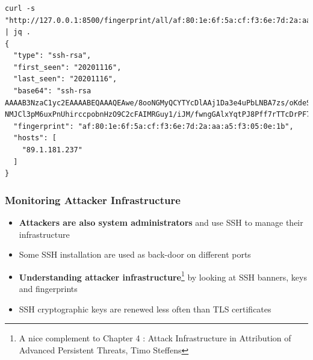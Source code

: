 \documentclass{beamer}
\begin{document}
\begin{frame}[t,fragile]
        \frametitle{}
\lstset{breaklines=true, language=JavaScript}
\begin{lstlisting}
curl -s "http://127.0.0.1:8500/fingerprint/all/af:80:1e:6f:5a:cf:f3:6e:7d:2a:aa:a5:f3:05:0e:1b"  | jq .
{
  "type": "ssh-rsa",
  "first_seen": "20201116",
  "last_seen": "20201116",
  "base64": "ssh-rsa AAAAB3NzaC1yc2EAAAABEQAAAQEAwe/8ooNGMyQCYTYcDlAAj1Da3e4uPbLNBA7zs/oKdeS9JhuJBO5oN0rwKk9B7Y429AL3OHHZUPVQMJ2Rt+fEfObYtLt+BI+289/DYdddUNxX3gU80rF4qiz1uQJ1FjcyW+LN1y219DE9rSshjY6aNPUshDhRuGnBxS
NMJCl3pM6uxPnUhirccpobnHzO9C2cFAIMRGuy1/iJM/fwngGAlxYqtPJ8Pff7rTTcDrPF7YB7STSQXvBTgiwCHVEuxyQaX7Aik5BM0A0DHDrwf6VHDbqWXK6AAM+01W8j1b+lN+yzT4+EZbQJ4kQKfNb8aGWAcHacjs9VOfr4w79ynz/lPQ==",
  "fingerprint": "af:80:1e:6f:5a:cf:f3:6e:7d:2a:aa:a5:f3:05:0e:1b",
  "hosts": [
    "89.1.181.237"
  ]
}
\end{lstlisting}
\end{frame}


\begin{frame}
        \frametitle{Monitoring Attacker Infrastructure}
        \begin{itemize}
                \item {\bf Attackers are also system administrators} and use SSH to manage their infrastructure
                \item Some SSH installation are used as back-door on different ports
                \item {\bf Understanding attacker infrastructure}\footnote{A nice complement to Chapter 4 : Attack Infrastructure in Attribution of Advanced Persistent Threats, Timo Steffens} by looking at SSH banners, keys and fingerprints
                \item SSH cryptographic keys are renewed less often than TLS certificates
        \end{itemize}
\end{frame}
\end{document}
